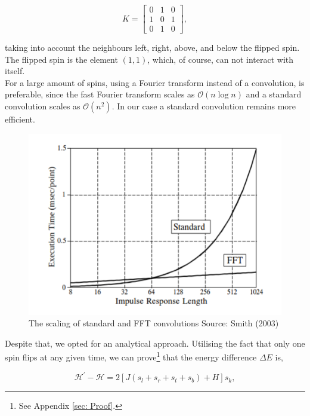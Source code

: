 \documentclass{IAYCPro}
\begin{document}
\begin{equation}
    K = \left[\begin{array}{ccc}
         0 & 1 & 0 \\
         1 & 0 & 1 \\
         0 & 1 & 0
    \end{array}
    \right],
\end{equation}

taking into account the neighbours left, right, above, and below the flipped spin. The flipped spin is the element $(1,1)$, which, of course, can not interact with itself. \\ 
For a large amount of spins, using a Fourier transform instead of a convolution, is preferable, since the fast Fourier transform scales as $\mathcal{O}(n\log n)$ and a standard convolution scales as $\mathcal{O}(n^2)$. In our case a standard convolution remains more efficient.

\raggedbottom
\newpage

\begin{figure}[H]
    \centering
    \includegraphics[scale = 0.9]{figs/fftvsnormal.png}
    \caption{The scaling of standard and FFT convolutions \small Source: Smith (2003) \cite{smith2003digital}}
    \label{fig:enter-label}
\end{figure}

Despite that, we opted for an analytical approach. Utilising the fact that only one spin flips at any given time, we can prove\footnote{See Appendix \ref{sec: Proof}.} that the energy difference $\Delta E$ is,

\begin{equation}
    \mathcal{H}^{\prime}-\mathcal{H}=2\left[ J \left(s_l+s_r+s_t+s_b\right)+ H\right]s_k,
    \label{eqn: Energy Difference}
\end{equation}
\end{document}
